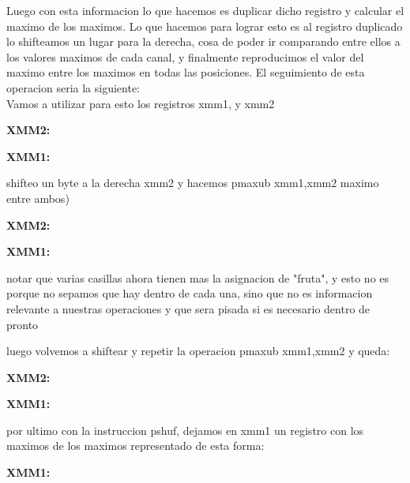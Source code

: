  Luego con esta informacion lo que hacemos es duplicar dicho registro y calcular el maximo de los maximos. Lo que hacemos para lograr esto es al registro duplicado	 lo shifteamos un lugar para la derecha, cosa de poder ir comparando entre ellos a los valores maximos de cada canal, y finalmente reproducimos el valor del maximo entre los maximos en todas las posiciones. El seguimiento de esta operacion seria la siguiente: 
\\Vamos a utilizar para esto los registros xmm1, y xmm2
\\
\par{\textbf{XMM2:}}
\par{\textbf{XMM1:}}
\par{shifteo un byte a la derecha xmm2 y hacemos pmaxub xmm1,xmm2  maximo entre ambos)}
\par{\textbf{XMM2:}}

\par{\textbf{XMM1:}}
\par {notar que varias casillas ahora tienen mas la asignacion de "fruta", y esto no es porque no sepamos que hay dentro de cada una, sino que no es informacion relevante a nuestras operaciones y que sera pisada si es necesario dentro de pronto}
\par{luego volvemos a shiftear y repetir la operacion pmaxub xmm1,xmm2  y queda: }

\par{\textbf{XMM2:}}

\par{\textbf{XMM1:}}
\par{por ultimo con la instruccion pshuf, dejamos en xmm1 un registro con los maximos de los maximos representado de esta forma: }
\par{\textbf{XMM1:}}


